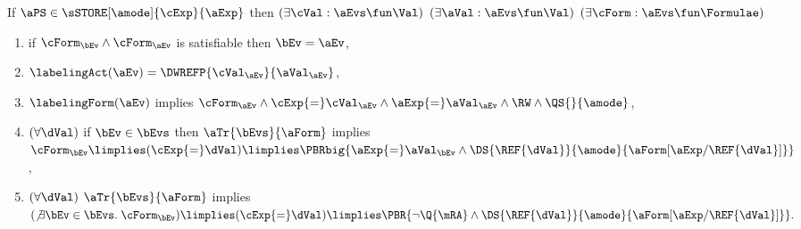 \noindent
If $\aPS \in \sSTORE[\amode]{\cExp}{\aExp}$ then
$(\exists\cVal:\aEvs\fun\Val)$
$(\exists\aVal:\aEvs\fun\Val)$
$(\exists\cForm:\aEvs\fun\Formulae)$
\begin{enumerate}
\item if $\cForm_\bEv\land\cForm_\aEv$ is satisfiable then $\bEv=\aEv$,
\item $\labelingAct(\aEv) = \DWREFP{\cVal_\aEv}{\aVal_\aEv}$,
\item 
  $\labelingForm(\aEv)$ implies
  \begin{math}
    \cForm_\aEv
    \land \cExp{=}\cVal_\aEv
    \land \aExp{=}\aVal_\aEv
    \land \RW
    \land \QS{}{\amode}
  \end{math},
\item
  \begin{math}
    (\forall\dVal)
  \end{math}
  if
  $\bEv\in\bEvs$
  then
  $\aTr{\bEvs}{\aForm}$ implies 
  \begin{math}
    \cForm_\bEv
    \limplies (\cExp{=}\dVal)
    \limplies \PBRbig{
      \aExp{=}\aVal_\bEv
      \land \DS{\REF{\dVal}}{\amode}{\aForm[\aExp/\REF{\dVal}]}
    }
  \end{math},
\item 
  \begin{math}
    (\forall\dVal)
  \end{math}
  $\aTr{\bEvs}{\aForm}$ implies 
  \begin{math}
    (\not\exists\bEv\in\bEvs.\; \cForm_\bEv)
    \limplies (\cExp{=}\dVal)
    \limplies \PBR{
      \lnot\Q{\mRA}
      \land \DS{\REF{\dVal}}{\amode}{\aForm[\aExp/\REF{\dVal}]}
    }.
  \end{math}
\end{enumerate}

